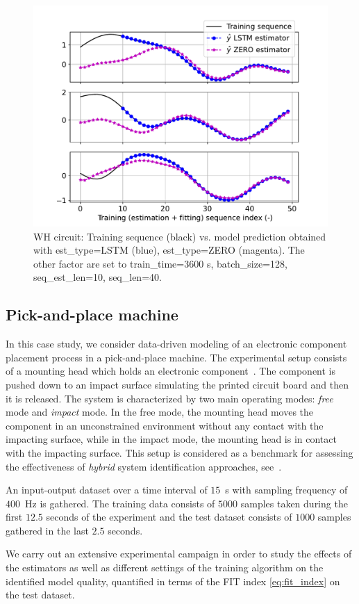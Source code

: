 \documentclass{article}
\begin{document}
\begin{figure}
    \centering
    \includegraphics[width=.6\columnwidth]{figures/wh_subseq_best_worst.pdf}
    \caption{WH circuit: Training sequence (black) vs. model prediction obtained with est\_type=LSTM (blue), est\_type=ZERO (magenta). 
    The other factor are set to train\_time=3600 s, batch\_size=128, seq\_est\_len=10, seq\_len=40.}
    \label{fig:wh_subset_best_worst}
\end{figure}

\subsection{Pick-and-place machine}
In this case study, we consider data-driven modeling of an electronic component placement process in a pick-and-place machine. The experimental setup consists of a mounting head which holds an electronic component~\cite{juloski2004pickplace}. The component is pushed down to an impact surface simulating the printed circuit board and then it is released.   The system is characterized by two main operating modes: \emph{free} mode and \emph{impact} mode. In the free mode, the mounting head moves the component in an unconstrained environment without any contact with the impacting surface, while in the impact mode, the mounting head is in contact with the impacting surface. This setup is considered as a benchmark for assessing the effectiveness of \emph{hybrid} system identification approaches, see~\cite{bemporad2005bounded, piga2020bayes}.


An input-output dataset over a time interval of $15$~s with sampling frequency of $400$~Hz  is gathered. The training data consists of $5000$ samples taken during the first $12.5$ seconds of the experiment and the test dataset consists of $1000$ samples gathered in the last $2.5$ seconds.


We carry out an extensive experimental campaign in order to study the effects of the estimators  as well as different settings of the training algorithm on the identified model quality, quantified in terms of the {FIT} index \eqref{eq:fit_index} on the test dataset.
\end{document}
